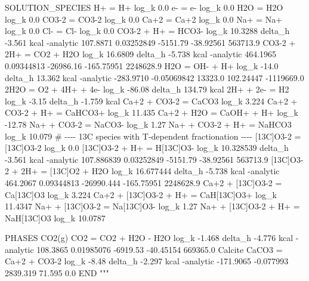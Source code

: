 \documentclass[
  letterpaper,
  DIV=11,
  numbers=noendperiod]{scrartcl}
\newenvironment{Shaded}{\begin{snugshade}}{\end{snugshade}}
\newcommand{\StringTok}[1]{\textcolor[rgb]{0.13,0.47,0.30}{#1}}
\begin{document}
\begin{Shaded}
\begin{Highlighting}[]
\StringTok{SOLUTION\_SPECIES}
\StringTok{H+ = H+}
\StringTok{    log\_k 0.0}
\StringTok{e{-} = e{-}}
\StringTok{    log\_k 0.0}
\StringTok{H2O = H2O}
\StringTok{    log\_k 0.0}
\StringTok{CO3{-}2 = CO3{-}2}
\StringTok{    log\_k 0.0}
\StringTok{Ca+2 = Ca+2}
\StringTok{    log\_k 0.0}
\StringTok{Na+ = Na+}
\StringTok{    log\_k 0.0}
\StringTok{Cl{-} = Cl{-}}
\StringTok{    log\_k 0.0}
\StringTok{CO3{-}2 + H+ = HCO3{-}}
\StringTok{    log\_k 10.3288}
\StringTok{    delta\_h {-}3.561 kcal}
\StringTok{    {-}analytic 107.8871 0.03252849 {-}5151.79 {-}38.92561 563713.9}
\StringTok{CO3{-}2 + 2H+ = CO2 + H2O}
\StringTok{    log\_k 16.6809}
\StringTok{    delta\_h {-}5.738 kcal}
\StringTok{    {-}analytic 464.1965 0.09344813 {-}26986.16 {-}165.75951 2248628.9}
\StringTok{H2O = OH{-} + H+}
\StringTok{    log\_k {-}14.0}
\StringTok{    delta\_h 13.362 kcal}
\StringTok{    {-}analytic {-}283.9710 {-}0.05069842 13323.0 102.24447 {-}1119669.0}
\StringTok{2H2O = O2 + 4H+ + 4e{-}}
\StringTok{    log\_k {-}86.08}
\StringTok{    delta\_h 134.79 kcal}
\StringTok{2H+ + 2e{-} = H2}
\StringTok{    log\_k {-}3.15}
\StringTok{    delta\_h {-}1.759 kcal}
\StringTok{Ca+2 + CO3{-}2 = CaCO3}
\StringTok{    log\_k 3.224}
\StringTok{Ca+2 + CO3{-}2 + H+ = CaHCO3+}
\StringTok{    log\_k 11.435}
\StringTok{Ca+2 + H2O = CaOH+ + H+}
\StringTok{    log\_k {-}12.78}
\StringTok{Na+ + CO3{-}2 = NaCO3{-}}
\StringTok{    log\_k 1.27}
\StringTok{Na+ + CO3{-}2 + H+ = NaHCO3}
\StringTok{    log\_k 10.079}
\StringTok{\# {-}{-}{-}{-} 13C species with T{-}dependent fractionation {-}{-}{-}{-}}
\StringTok{[13C]O3{-}2 = [13C]O3{-}2}
\StringTok{    log\_k 0.0}
\StringTok{[13C]O3{-}2 + H+ = H[13C]O3{-}}
\StringTok{    log\_k 10.328539}
\StringTok{    delta\_h {-}3.561 kcal}
\StringTok{    {-}analytic 107.886839 0.03252849 {-}5151.79 {-}38.92561 563713.9}
\StringTok{[13C]O3{-}2 + 2H+ = [13C]O2 + H2O}
\StringTok{    log\_k 16.677444}
\StringTok{    delta\_h {-}5.738 kcal}
\StringTok{    {-}analytic 464.2067 0.09344813 {-}26990.444 {-}165.75951 2248628.9}
\StringTok{Ca+2 + [13C]O3{-}2 = Ca[13C]O3}
\StringTok{    log\_k 3.224}
\StringTok{Ca+2 + [13C]O3{-}2 + H+ = CaH[13C]O3+}
\StringTok{    log\_k 11.4347}
\StringTok{Na+ + [13C]O3{-}2 = Na[13C]O3{-}}
\StringTok{    log\_k 1.27}
\StringTok{Na+ + [13C]O3{-}2 + H+ = NaH[13C]O3}
\StringTok{    log\_k 10.0787}

\StringTok{PHASES}
\StringTok{CO2(g)}
\StringTok{    CO2 = CO2 + H2O {-} H2O}
\StringTok{    log\_k {-}1.468}
\StringTok{    delta\_h {-}4.776 kcal}
\StringTok{    {-}analytic 108.3865 0.01985076 {-}6919.53 {-}40.45154 669365.0}
\StringTok{Calcite}
\StringTok{    CaCO3 = Ca+2 + CO3{-}2}
\StringTok{    log\_k {-}8.48}
\StringTok{    delta\_h {-}2.297 kcal}
\StringTok{    {-}analytic {-}171.9065 {-}0.077993 2839.319 71.595 0.0}
\StringTok{END}
\StringTok{"""}
\end{Highlighting}
\end{Shaded}
\end{document}

